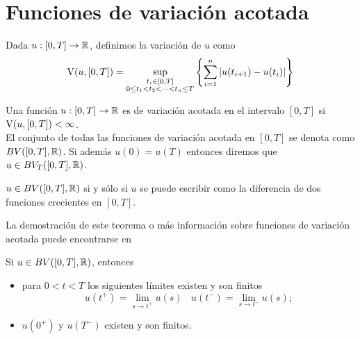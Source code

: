 \section{Funciones de variación acotada}



\begin{defi}
	Dada $u:[0,T]\to \mathbb{R}$, definimos la variación  de $u$ como 
	$$\operatorname{V}(u,[0,T])=\sup_{\substack{ t_i\in [0,T]\\
			0\leq t_1 < t_2< \dots < t_n  \leq T}}\left\lbrace \sum_{i=1}^{n}|u(t_{i+1})-u(t_i)|\right\rbrace $$
\end{defi}

\reversemarginpar
\begin{defi}
	Una función $u:[0,T]\to \mathbb{R}$ es de variación acotada en el intervalo $[0,T]$ si $\operatorname{V}(u,[0,T])<\infty$. \\ 
	El conjunto de todas las funciones de variación acotada en $[0,T]$ se denota como $BV([0,T],\mathbb{R})$. 
	Si además $u(0)=u(T)$ entonces diremos que $u\in BV_T([0,T],\mathbb{R})$. 
\end{defi}
\begin{thm}\label{T-VB}
	 $u\in BV([0,T],\mathbb{R})$ si y sólo si $u$ se puede escribir como la diferencia de dos funciones crecientes en $[0,T]$.
\end{thm}

La demostración de este teorema o más información sobre funciones de variación acotada puede encontrarse en 
 \cite[]{Carter} %
\begin{cor}
	Si $u\in BV([0,T],\mathbb{R})$, entonces 
	\begin{itemize}
		\item para $0<t<T$ los siguientes límites existen y son finitos
		$$u(t^+)=\lim\limits_{s\to t^+}u(s) \ \ \ \ u(t^-)=\lim\limits_{s\to t^-}u(s);$$
		\item $u(0^+)$ y $u(T^-)$ existen y son finitos.
	\end{itemize}
\end{cor}






